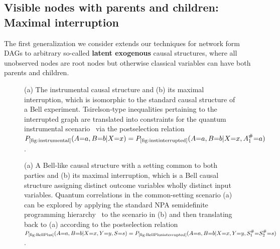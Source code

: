 \documentclass[superscriptaddress,aps,prx,nofootinbib,twocolumn,twoside,reprint,letterpaper,longbibliography]{revtex4-2}
\newcommand{\term}[1]{\textcolor{medblue}{\textbf{#1}}}
\begin{document}
\subsection{Visible nodes with parents and children: Maximal interruption}\label{sec:interruption}
The first generalization we consider extends our techniques for network form DAGs to arbitrary so-called \term{latent exogenous} causal structures, where all unobserved nodes are root nodes but otherwise classical variables can have both parents and children.

\begin{figure}[b]
  \begin{center}
    \hfill
    \hfill
     \hfill
  \end{center}
  \caption[]{(a) The instrumental causal structure and (b) its maximal interruption, which is isomorphic to the standard causal structure of a Bell experiment. Tsirelson-type inequalities pertaining to the interrupted graph are translated into constraints for the quantum instrumental scenario~\cite{Himbeeck2018instrumental,Agresti2019,Quantifying2020} via the postselection relation ${P_{\text{\ref{fig:instrumental}}}(A{=}a,B{=}b|X{=}x)} = {P_{\text{\ref{fig:instinterrupted}}}(A{=}a,B{=}b|X{=}x,A^{\#}_1{=}a)}$.
  }
  \label{fig:instinterruptionexample}
\end{figure}

\begin{figure}[b]
  \begin{center}
    \hfill
    \hfill
     \hfill
  \end{center}
  \caption[]{(a) A Bell-like causal structure with a setting common to both parties and (b) its maximal interruption, which is a Bell causal structure assigning distinct outcome variables wholly distinct input variables. Quantum correlations in the common-setting scenario (a) can be explored by applying the standard NPA semidefinite programming hierarchy~\cite{npa,npa2} to the scenario in (b) and then translating back to (a) according to the postselection relation ${P_{\text{\ref{fig:BellPlus}}}(A{=}a,B{=}b|X{=}x,Y{=}y,S{=}s)} = {P_{\text{\ref{fig:BellPlusinterrupted}}}(A{=}a,B{=}b|X{=}x,Y{=}y,S^{\#}_1{=}S^{\#}_2{=}s)}$.
  }
  \label{fig:Bellinterruptionexample}
\end{figure}
\end{document}
